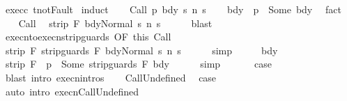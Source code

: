 \begin{isabellebody}
%
\isadelimproof
%
\endisadelimproof
%
\isatagproof
{}\isamarkupfalse%
\ exec{\isacharunderscore}c\ t{\isacharunderscore}not{\isacharunderscore}Fault\isanewline
{}\isamarkupfalse%
\ {\isacharparenleft}induct{\isacharparenright}\isanewline
\ \ \isamarkupfalse%
\ {\isacharparenleft}Call\ p\ bdy\ s\ n\ s{\isacharprime}{\isacharparenright}\isanewline
\ \ \isamarkupfalse%
\ bdy{\isacharcolon}\ {\isachardoublequoteopen}{\isasymGamma}\ p\ {\isacharequal}\ Some\ bdy{\isachardoublequoteclose}\ \isamarkupfalse%
\ fact\isanewline
\ \ \isamarkupfalse%
\ Call\ \isamarkupfalse%
\ {\isachardoublequoteopen}strip\ F\ {\isasymGamma}{\isasymturnstile}{\isasymlangle}bdy{\isacharcomma}Normal\ s{\isasymrangle}\ {\isacharequal}n{\isasymRightarrow}\ s{\isacharprime}{\isachardoublequoteclose}\isanewline
\ \ \ \ \isamarkupfalse%
\ blast\isanewline
\ \ \isamarkupfalse%
\ execn{\isacharunderscore}to{\isacharunderscore}execn{\isacharunderscore}strip{\isacharunderscore}guards{\isacharprime}\ {\isacharbrackleft}OF\ this{\isacharbrackright}\ Call\isanewline
\ \ \isamarkupfalse%
\ {\isachardoublequoteopen}strip\ F\ {\isasymGamma}{\isasymturnstile}{\isasymlangle}strip{\isacharunderscore}guards\ F\ bdy{\isacharcomma}Normal\ s{\isasymrangle}\ {\isacharequal}n{\isasymRightarrow}\ s{\isacharprime}{\isachardoublequoteclose}\isanewline
\ \ \ \ \isamarkupfalse%
\ simp\isanewline
\ \ \isamarkupfalse%
\ \isamarkupfalse%
\ bdy\ \isamarkupfalse%
\ {\isachardoublequoteopen}{\isacharparenleft}strip\ F\ {\isasymGamma}{\isacharparenright}\ p\ {\isacharequal}\ Some\ {\isacharparenleft}strip{\isacharunderscore}guards\ F\ bdy{\isacharparenright}{\isachardoublequoteclose}\isanewline
\ \ \ \ \isamarkupfalse%
\ simp\isanewline
\ \ \isamarkupfalse%
\isanewline
\ \ \isamarkupfalse%
\ {\isacharquery}case\isanewline
\ \ \ \ \isamarkupfalse%
\ {\isacharparenleft}blast\ intro{\isacharcolon}\ execn{\isachardot}intros{\isacharparenright}\isanewline
{}\isamarkupfalse%
\isanewline
\ \ \isamarkupfalse%
\ CallUndefined\ \isamarkupfalse%
\ {\isacharquery}case\ \isamarkupfalse%
\ {\isacharparenleft}auto\ intro{\isacharcolon}\ execn{\isachardot}CallUndefined{\isacharparenright}\isanewline
{}\isamarkupfalse%
\isanewline
\ \ \isamarkupfalse%

\end{isabellebody}
